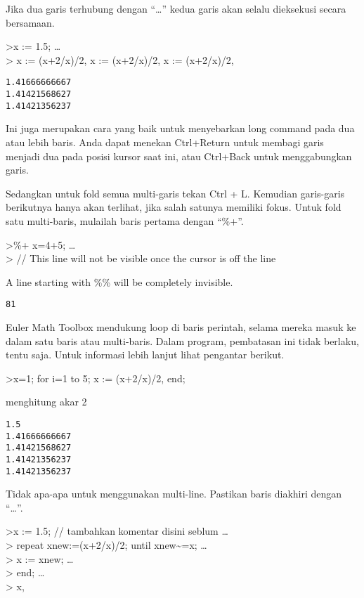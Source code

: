 \documentclass[
]{book}
\begin{document}
Jika dua garis terhubung dengan ``\ldots{}'' kedua garis akan selalu dieksekusi secara bersamaan.

\textgreater x := 1.5; \ldots{}\\
\textgreater{} x := (x+2/x)/2, x := (x+2/x)/2, x := (x+2/x)/2,

\begin{verbatim}
1.41666666667
1.41421568627
1.41421356237
\end{verbatim}

Ini juga merupakan cara yang baik untuk menyebarkan long command pada dua atau lebih baris. Anda dapat menekan Ctrl+Return untuk membagi garis menjadi dua pada posisi kursor saat ini, atau Ctrl+Back untuk menggabungkan garis.

Sedangkan untuk fold semua multi-garis tekan Ctrl + L. Kemudian garis-garis berikutnya hanya akan terlihat, jika salah satunya memiliki fokus. Untuk fold satu multi-baris, mulailah baris pertama dengan ``\%+''.

\textgreater\%+ x=4+5; \ldots{}\\
\textgreater{} // This line will not be visible once the cursor is off the line

A line starting with \%\% will be completely invisible.

\begin{verbatim}
81
\end{verbatim}

Euler Math Toolbox mendukung loop di baris perintah, selama mereka masuk ke dalam satu baris atau multi-baris. Dalam program, pembatasan ini tidak berlaku, tentu saja. Untuk informasi lebih lanjut lihat pengantar berikut.

\textgreater x=1; for i=1 to 5; x := (x+2/x)/2, end;

menghitung akar 2

\begin{verbatim}
1.5
1.41666666667
1.41421568627
1.41421356237
1.41421356237
\end{verbatim}

Tidak apa-apa untuk menggunakan multi-line. Pastikan baris diakhiri dengan ``\ldots{}''.

\textgreater x := 1.5; // tambahkan komentar disini seblum \ldots{}\\
\textgreater{} repeat xnew:=(x+2/x)/2; until xnew\textasciitilde=x; \ldots{}\\
\textgreater{} x := xnew; \ldots{}\\
\textgreater{} end; \ldots{}\\
\textgreater{} x,
\end{document}
